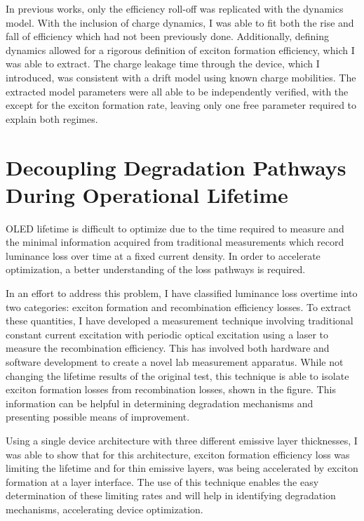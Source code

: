 \documentclass[11pt,a4paper,roman]{moderncv}
\begin{document}
In previous works, only the efficiency roll-off was replicated with the dynamics model.  With the inclusion of charge dynamics, I was able to fit both the rise and fall of efficiency which had not been previously done.  Additionally, defining dynamics allowed for a rigorous definition of exciton formation efficiency, which I was able to extract.  The charge leakage time through the device, which I introduced, was consistent with a drift model using known charge mobilities.  The extracted model parameters were all able to be independently verified, with the except for the exciton formation rate, leaving only one free parameter required to explain both regimes.

\section*{Decoupling Degradation Pathways During Operational Lifetime}

OLED lifetime is difficult to optimize due to the time required to measure and the minimal information acquired from traditional measurements which record luminance loss over time at a fixed current density.  In order to accelerate optimization, a better understanding of the loss pathways is required.  

In an effort to address this problem, I have classified luminance loss overtime into two categories:  exciton formation and recombination efficiency losses.  To extract these quantities, I have developed a measurement technique involving traditional constant current excitation with periodic optical excitation using a laser to measure the recombination efficiency.  This has involved both hardware and software development to create a novel lab measurement apparatus.  While not changing the lifetime results of the original test, this technique is able to isolate exciton formation losses from recombination losses, shown in the figure.  This information can be helpful in determining degradation mechanisms and presenting possible means of improvement.

Using a single device architecture with three different emissive layer thicknesses, I was able to show that for this architecture, exciton formation efficiency loss was limiting the lifetime and for thin emissive layers, was being accelerated by exciton formation at a layer interface.  The use of this technique enables the easy determination of these limiting rates and will help in identifying degradation mechanisms, accelerating device optimization.
\end{document}
